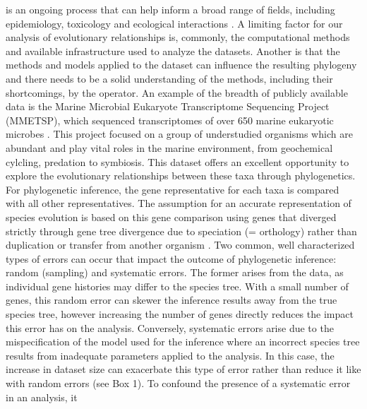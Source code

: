 \documentclass[12pt]{article}
\begin{document}
 is an ongoing process that can help inform a broad range of fields, including epidemiology, toxicology and ecological interactions \cite{mctavish2017and}. %
A limiting factor for our analysis of evolutionary relationships is, commonly, the computational methods and available infrastructure used to analyze the datasets. 
Another is that the methods and models applied to the dataset can influence the resulting phylogeny and there needs to be a solid understanding of the methods, including their shortcomings, by the operator.
An example of the breadth of publicly available data is the Marine Microbial Eukaryote Transcriptome Sequencing Project (MMETSP), which sequenced transcriptomes of over 650 marine eukaryotic microbes \cite{keeling2014marine}. 
This project focused on a group of understudied organisms which are abundant and play vital roles in the marine environment, from geochemical cylcling, predation to symbiosis. %
This dataset offers an excellent opportunity to explore the evolutionary relationships between these taxa through phylogenetics. 
For phylogenetic inference, the gene representative for each taxa is compared with all other representatives. 
The assumption for an accurate representation of species evolution is based on this gene comparison using genes that diverged strictly through  gene tree divergence due to speciation (= orthology) rather than duplication or transfer from another organism \cite{maddison1997gene}. 
Two common, well characterized types of errors can occur that impact the outcome of phylogenetic inference: random (sampling) and systematic errors. 
The former arises from the data, as individual gene histories may differ to the species tree. 
With a small number of genes, this random error can skewer the inference results away from the true species tree, however increasing the number of genes directly reduces the impact this error has on the analysis. 
Conversely, systematic errors arise due to the mispecification of the model used for the inference where an incorrect species tree results from inadequate parameters applied to the analysis. 
In this case, the increase in dataset size can exacerbate this type of error rather than reduce it like with random errors (see Box 1).  
To confound the presence of a systematic error in an analysis, it
\end{document}
